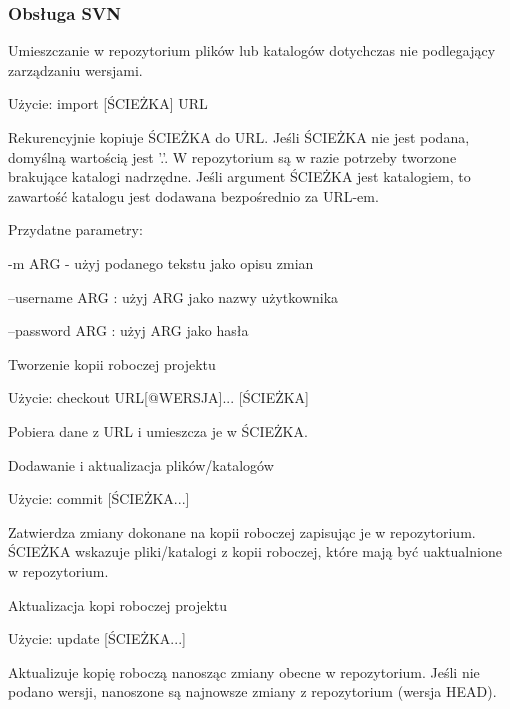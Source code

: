 \subsubsection{Obsługa SVN}
Umieszczanie w repozytorium plików lub katalogów dotychczas nie podlegający zarządzaniu wersjami.

Użycie: import [ŚCIEŻKA] URL

Rekurencyjnie kopiuje ŚCIEŻKA do URL. Jeśli ŚCIEŻKA nie jest podana, domyślną wartością jest '.'. W repozytorium są w razie potrzeby tworzone brakujące katalogi nadrzędne. Jeśli argument ŚCIEŻKA jest katalogiem, to zawartość katalogu jest dodawana bezpośrednio za URL-em.

Przydatne parametry:

-m ARG  -  użyj podanego tekstu jako opisu zmian

--username ARG  : użyj ARG jako nazwy użytkownika

--password ARG  : użyj ARG jako hasła

Tworzenie kopii roboczej projektu

Użycie: checkout URL[@WERSJA]... [ŚCIEŻKA]

Pobiera dane z URL i umieszcza je w ŚCIEŻKA.

Dodawanie i aktualizacja plików/katalogów

Użycie: commit [ŚCIEŻKA...]

Zatwierdza zmiany dokonane na kopii roboczej zapisując je w repozytorium. ŚCIEŻKA wskazuje pliki/katalogi z kopii roboczej, które mają być uaktualnione w repozytorium.

Aktualizacja kopi roboczej projektu

Użycie: update [ŚCIEŻKA...]

Aktualizuje kopię roboczą nanosząc zmiany obecne w repozytorium.  Jeśli nie podano wersji, nanoszone są najnowsze zmiany z  repozytorium (wersja HEAD).

